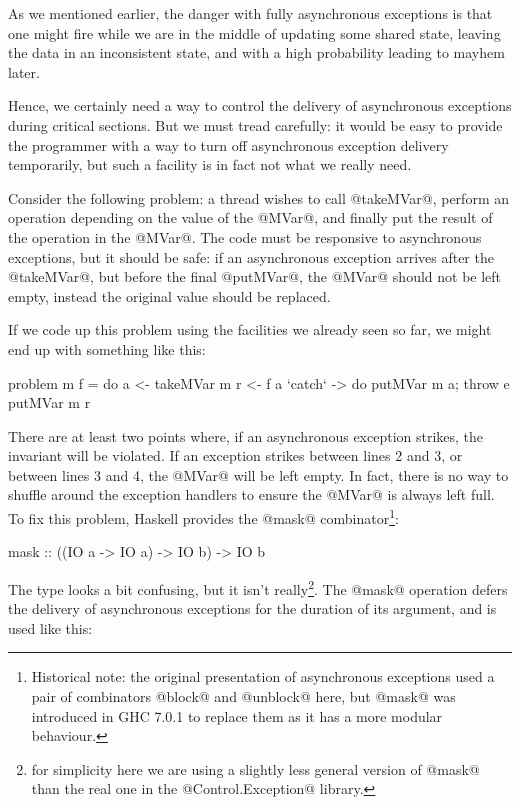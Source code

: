
As we mentioned earlier, the danger with fully asynchronous exceptions
is that one might fire while we are in the middle of updating some
shared state, leaving the data in an inconsistent state, and with a
high probability leading to mayhem later.

Hence, we certainly need a way to control the delivery of asynchronous
exceptions during critical sections.  But we must tread carefully: it
would be easy to provide the programmer with a way to turn off
asynchronous exception delivery temporarily, but such a facility is in
fact not what we really need.

Consider the following problem: a thread wishes to call @takeMVar@,
perform an operation depending on the value of the @MVar@, and finally
put the result of the operation in the @MVar@.  The code must be
responsive to asynchronous exceptions, but it should be safe: if an
asynchronous exception arrives after the @takeMVar@, but before the
final @putMVar@, the @MVar@ should not be left empty, instead the
original value should be replaced.

If we code up this problem using the facilities we already seen so
far, we might end up with something like this:

\begin{numhaskell}
problem m f = do
  a <- takeMVar m
  r <- f a `catch` \e -> do putMVar m a; throw e
  putMVar m r
\end{numhaskell}

\noindent There are at least two points where, if an asynchronous
exception strikes, the invariant will be violated.  If an exception
strikes between lines 2 and 3, or between lines 3 and 4, the @MVar@
will be left empty.  In fact, there is no way to shuffle around the
exception handlers to ensure the @MVar@ is always left full.  To fix
this problem, Haskell provides the @mask@
combinator\footnote{Historical note: the original presentation of
  asynchronous exceptions used a pair of combinators @block@ and
  @unblock@ here, but @mask@ was introduced in GHC 7.0.1 to replace
  them as it has a more modular behaviour.}:

\begin{haskell}
mask :: ((IO a -> IO a) -> IO b) -> IO b
\end{haskell}

\noindent The type looks a bit confusing, but it isn't
really\footnote{for simplicity here we are using a slightly less
  general version of @mask@ than the real one in the
  @Control.Exception@ library.}.  The @mask@ operation defers the
delivery of asynchronous exceptions for the duration of its argument,
and is used like this:

